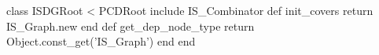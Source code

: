 \begin{rubyblock}
class ISDGRoot < PCDRoot
  include IS_Combinator
  def init_covers
    return IS_Graph.new
  end
  def get_dep_node_type
    return Object.const_get('IS_Graph')
  end
end
\end{rubyblock}
